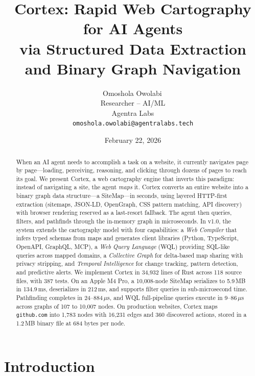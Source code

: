 \documentclass[10pt, twocolumn]{article}
\title{\textbf{Cortex: Rapid Web Cartography for AI Agents\\via Structured Data Extraction and Binary Graph Navigation}}
\author{Omoshola Owolabi\,\orcidlink{0009-0006-4089-0732}\\Researcher -- AI/ML\\Agentra Labs\\\texttt{omoshola.owolabi@agentralabs.tech}}
\date{February 22, 2026}
\begin{document}
\maketitle
\thispagestyle{fancy}

\begin{abstract}
When an AI agent needs to accomplish a task on a website, it currently navigates page by page---loading, perceiving, reasoning, and clicking through dozens of pages to reach its goal. We present Cortex, a web cartography engine that inverts this paradigm: instead of navigating a site, the agent \emph{maps} it. Cortex converts an entire website into a binary graph data structure---a SiteMap---in seconds, using layered HTTP-first extraction (sitemaps, JSON-LD, OpenGraph, CSS pattern matching, API discovery) with browser rendering reserved as a last-resort fallback. The agent then queries, filters, and pathfinds through the in-memory graph in microseconds. In v1.0, the system extends the cartography model with four capabilities: a \emph{Web Compiler} that infers typed schemas from maps and generates client libraries (Python, TypeScript, OpenAPI, GraphQL, MCP), a \emph{Web Query Language} (WQL) providing SQL-like queries across mapped domains, a \emph{Collective Graph} for delta-based map sharing with privacy stripping, and \emph{Temporal Intelligence} for change tracking, pattern detection, and predictive alerts. We implement Cortex in 34{,}932 lines of Rust across 118 source files, with 387 tests. On an Apple M4 Pro, a 10{,}008-node SiteMap serializes to 5.9\,MB in 134.9\,ms, deserializes in 212\,ms, and supports filter queries in sub-microsecond time. Pathfinding completes in 24--884\,$\mu$s, and WQL full-pipeline queries execute in 9--86\,$\mu$s across graphs of 107 to 10{,}007 nodes. On production websites, Cortex maps \texttt{github.com} into 1{,}783 nodes with 16{,}231 edges and 360 discovered actions, stored in a 1.2\,MB binary file at 684 bytes per node.
\end{abstract}

\section{Introduction}
\label{sec:intro}
\end{document}
